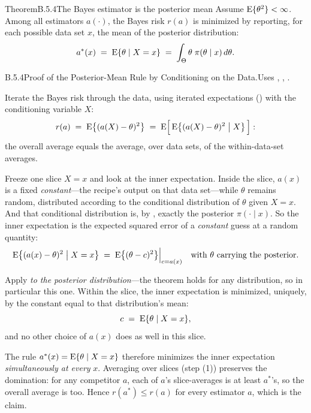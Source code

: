 \documentclass[main.tex]{subfiles}
\begin{document}
\begin{Obj}{Theorem}{B.5.4}{The Bayes estimator is the posterior mean}
Assume $\mathrm{E}\{\theta^2\}<\infty$. Among all estimators $a(\cdot)$, the Bayes risk $r(a)$ is
minimized by reporting, for each possible data set $x$, the mean of the posterior
distribution:
\[ a^{*}(x) \;=\; \mathrm{E}\{\theta \mid X = x\}
   \;=\; \int_{\Theta} \theta\; \pi(\theta\mid x)\, d\theta . \]
\end{Obj}
\begin{Prf}{B.5.4}{Proof of the Posterior-Mean Rule by Conditioning on the Data.}{Uses , , .}
\item Iterate the Bayes risk through the data, using iterated expectations ()
      with the conditioning variable $X$:
      \[ r(a) \;=\; \mathrm{E}\big\{ (a(X)-\theta)^2 \big\}
         \;=\; \mathrm{E}\Big[\, \mathrm{E}\big\{ (a(X)-\theta)^2 \bigm| X \big\} \,\Big] : \]
      the overall average equals the average, over data sets, of the within-data-set
      averages.
\item Freeze one slice $X=x$ and look at the inner expectation. Inside the slice, $a(x)$ is
      a fixed \emph{constant}---the recipe's output on that data set---while $\theta$
      remains random, distributed according to the conditional distribution of $\theta$
      given $X=x$. And that conditional distribution is, by , exactly the
      posterior $\pi(\cdot\mid x)$. So the inner expectation is the expected squared error
      of a \emph{constant} guess at a random quantity:
      \[ \mathrm{E}\big\{ (a(x) - \theta)^2 \bigm| X=x \big\}
         \;=\; \mathrm{E}\big\{ (\theta - c)^2 \big\}\Big|_{c=a(x)}
         \quad\text{with $\theta$ carrying the posterior.} \]
\item Apply  \emph{to the posterior distribution}---the theorem holds for any
      distribution, so in particular this one. Within the slice, the inner expectation is
      minimized, uniquely, by the constant equal to that distribution's mean:
      \[ c \;=\; \mathrm{E}\{\theta \mid X = x\} , \]
      and no other choice of $a(x)$ does as well in this slice.
\item The rule $a^{*}(x)=\mathrm{E}\{\theta\mid X=x\}$ therefore minimizes the inner expectation
      \emph{simultaneously at every} $x$. Averaging over slices (step (1)) preserves the
      domination: for any competitor $a$, each of $a$'s slice-averages is at least
      $a^{*}$'s, so the overall average is too. Hence $r(a^{*})\le r(a)$ for every
      estimator $a$, which is the claim.
\end{Prf}
\end{document}
